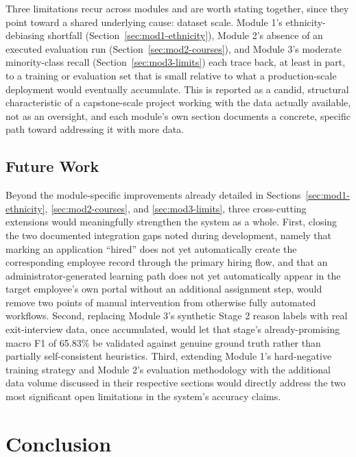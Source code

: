 \documentclass[11pt,a4paper]{article}
\begin{document}
Three limitations recur across modules and are worth stating together, since they point toward a shared underlying cause: dataset scale. Module 1's ethnicity-debiasing shortfall (Section~\ref{sec:mod1-ethnicity}), Module 2's absence of an executed evaluation run (Section~\ref{sec:mod2-courses}), and Module 3's moderate minority-class recall (Section~\ref{sec:mod3-limits}) each trace back, at least in part, to a training or evaluation set that is small relative to what a production-scale deployment would eventually accumulate. This is reported as a candid, structural characteristic of a capstone-scale project working with the data actually available, not as an oversight, and each module's own section documents a concrete, specific path toward addressing it with more data.

\subsection{Future Work}

Beyond the module-specific improvements already detailed in Sections~\ref{sec:mod1-ethnicity}, \ref{sec:mod2-courses}, and \ref{sec:mod3-limits}, three cross-cutting extensions would meaningfully strengthen the system as a whole. First, closing the two documented integration gaps noted during development, namely that marking an application ``hired'' does not yet automatically create the corresponding employee record through the primary hiring flow, and that an administrator-generated learning path does not yet automatically appear in the target employee's own portal without an additional assignment step, would remove two points of manual intervention from otherwise fully automated workflows. Second, replacing Module 3's synthetic Stage 2 reason labels with real exit-interview data, once accumulated, would let that stage's already-promising macro F1 of 65.83\% be validated against genuine ground truth rather than partially self-consistent heuristics. Third, extending Module 1's hard-negative training strategy and Module 2's evaluation methodology with the additional data volume discussed in their respective sections would directly address the two most significant open limitations in the system's accuracy claims.

\clearpage
\section{Conclusion}
\label{sec:conclusion}
\end{document}
